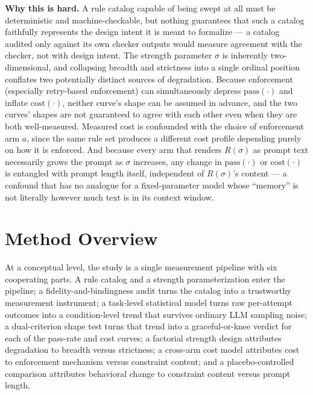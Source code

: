 \documentclass[11pt]{article}
\begin{document}
\noindent\textbf{Why this is hard.} A rule catalog capable of being swept at all must be deterministic and machine-checkable, but nothing guarantees that such a catalog faithfully represents the design intent it is meant to formalize --- a catalog audited only against its own checker outputs would measure agreement with the checker, not with design intent. The strength parameter $\sigma$ is inherently two-dimensional, and collapsing breadth and strictness into a single ordinal position conflates two potentially distinct sources of degradation. Because enforcement (especially retry-based enforcement) can simultaneously depress $\text{pass}(\cdot)$ and inflate $\text{cost}(\cdot)$, neither curve's shape can be assumed in advance, and the two curves' shapes are not guaranteed to agree with each other even when they are both well-measured. Measured cost is confounded with the choice of enforcement arm $a$, since the same rule set produces a different cost profile depending purely on how it is enforced. And because every arm that renders $R(\sigma)$ as prompt text necessarily grows the prompt as $\sigma$ increases, any change in $\text{pass}(\cdot)$ or $\text{cost}(\cdot)$ is entangled with prompt length itself, independent of $R(\sigma)$'s content --- a confound that has no analogue for a fixed-parameter model whose ``memory'' is not literally however much text is in its context window.

\section{Method Overview}

At a conceptual level, the study is a single measurement pipeline with six cooperating parts. A rule catalog and a strength parameterization enter the pipeline; a fidelity-and-bindingness audit turns the catalog into a trustworthy measurement instrument; a task-level statistical model turns raw per-attempt outcomes into a condition-level trend that survives ordinary LLM sampling noise; a dual-criterion shape test turns that trend into a graceful-or-knee verdict for each of the pass-rate and cost curves; a factorial strength design attributes degradation to breadth versus strictness; a cross-arm cost model attributes cost to enforcement mechanism versus constraint content; and a placebo-controlled comparison attributes behavioral change to constraint content versus prompt length.
\end{document}
